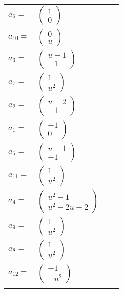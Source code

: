 \documentclass[1p]{elsarticle_modified}
\theoremstyle{definition}
\begin{document}
\begin{tabular}{m{7pt} m{180pt} m{7pt} m{180pt} }
\flushright $a_{6}=$&$\begin{pmatrix}1\\0\end{pmatrix}$ \\
\flushright $a_{10}=$&$\begin{pmatrix}0\\u\end{pmatrix}$ \\
\flushright $a_{3}=$&$\begin{pmatrix}u-1\\-1\end{pmatrix}$ \\
\flushright $a_{7}=$&$\begin{pmatrix}1\\u^2\end{pmatrix}$ \\
\flushright $a_{2}=$&$\begin{pmatrix}u-2\\-1\end{pmatrix}$ \\
\flushright $a_{1}=$&$\begin{pmatrix}-1\\0\end{pmatrix}$ \\
\flushright $a_{5}=$&$\begin{pmatrix}u-1\\-1\end{pmatrix}$ \\
\flushright $a_{11}=$&$\begin{pmatrix}1\\u^2\end{pmatrix}$ \\
\flushright $a_{4}=$&$\begin{pmatrix}u^2-1\\u^2-2 u-2\end{pmatrix}$ \\
\flushright $a_{9}=$&$\begin{pmatrix}1\\u^2\end{pmatrix}$ \\
\flushright $a_{8}=$&$\begin{pmatrix}1\\u^2\end{pmatrix}$ \\
\flushright $a_{12}=$&$\begin{pmatrix}-1\\- u^2\end{pmatrix}$\\&\end{tabular}
\end{document}
